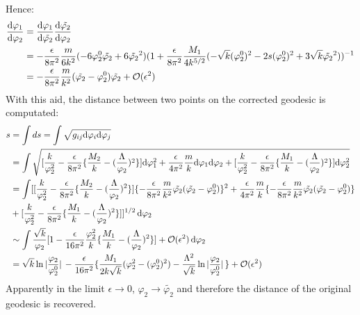 \documentclass[fleqn]{article}
\begin{document}
Hence:
\begin{align}
    \dv{\varphi_{1}}{\varphi_{2}} &= \dv{\varphi_{1}}{\tilde{\varphi_{2}}}\dv{\tilde{\varphi_{2}}}{\varphi_{2}} \nonumber \\
    &= -\frac{\epsilon}{8\pi^{2}}\frac{m}{6k^{2}} (-6\varphi_{2}^{0} \tilde{\varphi_{2}} + 6 \tilde{\varphi_{2}}^{2})(1+\frac{\epsilon}{8\pi^{2}} \frac{M_{1}}{4k^{5/2}} (-\sqrt{k}(\varphi_{2}^{0} )^{2} - 2s(\varphi_{2}^{0}) ^{2} + 3\sqrt{k} \tilde{\varphi_{2}}^{2}))^{-1} \nonumber \\
    &= -\frac{\epsilon}{8\pi^{2}}\frac{m}{k^{2}} (\tilde{\varphi_{2}} - \varphi_{2}^{0})\tilde{\varphi_{2}} + \mathcal{O}(\epsilon ^{2})
\end{align}
With this aid, the distance between two points on the corrected geodesic is computated:
\begin{align}
    s &= \int ds = \int \sqrt{g_{ij}\dd \varphi_{i} \dd \varphi_{j}} \nonumber \\
    &= \int \sqrt{[\frac{k}{\varphi_{2}^{2}} -\frac{\epsilon}{8\pi^{2}}\lbrace \frac{M_2}{k} - (\frac{\Lambda}{\varphi_{2}})^{2}\rbrace ]\dd \varphi_{1}^{2} + \frac{\epsilon}{4\pi^{2}} \frac{m}{k}\dd \varphi_{1} \dd \varphi_{2} +[\frac{k}{\varphi_{2}^{2}} -\frac{\epsilon}{8\pi^{2}}\lbrace \frac{M_1}{k} - (\frac{\Lambda}{\varphi_{2}})^{2}\rbrace ] \dd \varphi_{2}^{2} } \nonumber \\
    & = \int [[\frac{k}{\varphi_{2}^{2}} -\frac{\epsilon}{8\pi^{2}}\lbrace \frac{M_2}{k} - (\frac{\Lambda}{\varphi_{2}})^{2}\rbrace] \lbrace -\frac{\epsilon}{8\pi^{2}} \frac{m}{k^{2}} \tilde{\varphi_{2}}(\tilde{\varphi_{2}} -\varphi_{2}^{0}) \rbrace ^{2} + \frac{\epsilon}{4\pi^{2}}\frac{m}{k}\lbrace -\frac{\epsilon}{8\pi^{2}} \frac{m}{k^{2}} \tilde{\varphi_{2}}(\tilde{\varphi_{2}} -\varphi_{2}^{0}) \rbrace \nonumber \\
    & + [\frac{k}{\varphi_{2}^{2}} -\frac{\epsilon}{8\pi^{2}}\lbrace \frac{M_1}{k} - (\frac{\Lambda}{\varphi_{2}})^{2}\rbrace]]^{1/2} \dd {\varphi_{2}} \nonumber \\
    &\sim \int \frac{\sqrt{k}}{\varphi_{2}} [1- \frac{\epsilon}{16\pi^{2}} \frac{\varphi_{2}^{2}}{k} \lbrace\frac{M_{1}}{k} - (\frac{\Lambda}{\varphi_{2}})^{2} \rbrace ] + \order*{\epsilon^{2}} \dd{\varphi_{2}} \\
    &= \sqrt{k} \ln\abs*{\frac{\varphi_{2}}{\varphi_{2}^{0}}} - \frac{\epsilon}{16\pi^{2}}\lbrace \frac{M_{1}}{2k\sqrt{k}}(\varphi_{2}^{2} - (\varphi_{2}^{0})^{2}) - \frac{\Lambda^{2}}{\sqrt{k}}\ln\abs*{\frac{\varphi_{2}}{\varphi_{2}^{0}}} \rbrace + \order*{\epsilon ^{2}}
\end{align}
Apparently in the limit $\epsilon \to 0$, $\varphi_{2} \to \tilde{\varphi_{2}}$ and therefore the distance of the original geodesic is recovered.
\end{document}
